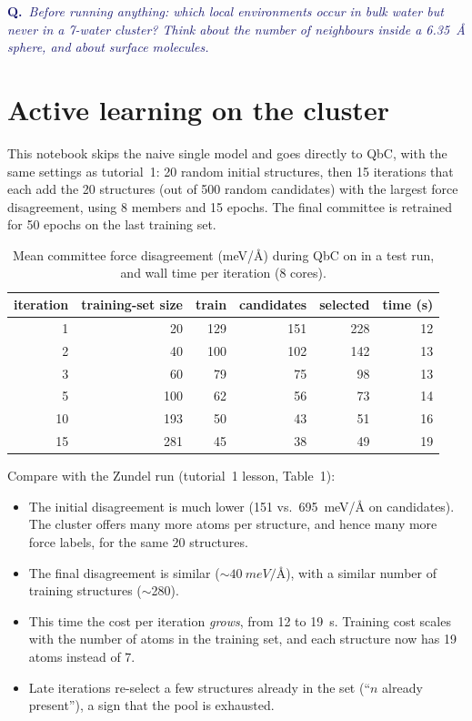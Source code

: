 \documentclass[11pt,a4paper]{article}
\newcommand{\question}[1]{\par\smallskip\noindent\textcolor{MidnightBlue}{\textbf{Q.}~\emph{#1}}\par\smallskip}
\begin{document}
\question{Before running anything: which local environments occur in bulk
water but never in a 7-water cluster? Think about the number of neighbours
inside a \SI{6.35}{\angstrom} sphere, and about surface molecules.}

\section{Active learning on the cluster}

This notebook skips the naive single model and goes directly to QbC, with the
same settings as tutorial~1: 20 random initial structures, then 15 iterations
that each add the 20 structures (out of 500 random candidates) with the largest
force disagreement, using 8 members and 15 epochs. The final committee is
retrained for 50 epochs on the last training set.

\begin{table}[h]
\centering\small
\caption{Mean committee force disagreement (\si{meV/\angstrom}) during QbC on
 in a test run, and wall time per iteration (8 cores).}
\label{tab:qbc}
\begin{tabular}{@{}rrrrrr@{}}
\toprule
iteration & training-set size & train & candidates & selected & time (s)\\
\midrule
1  & 20  & 129 & 151 & 228 & 12\\
2  & 40  & 100 & 102 & 142 & 13\\
3  & 60  &  79 &  75 &  98 & 13\\
5  & 100 &  62 &  56 &  73 & 14\\
10 & 193 &  50 &  43 &  51 & 16\\
15 & 281 &  45 &  38 &  49 & 19\\
\bottomrule
\end{tabular}
\end{table}

Compare with the Zundel run (tutorial~1 lesson, Table~1):
\begin{itemize}[nosep]
  \item The initial disagreement is much lower (151 vs.\ \SI{695}{meV/\angstrom}
        on candidates). The cluster offers many more atoms per structure, and
        hence many more force labels, for the same 20 structures.
  \item The final disagreement is similar ($\sim\SI{40}{meV/\angstrom}$), with a
        similar number of training structures ($\sim$280).
  \item This time the cost per iteration \emph{grows}, from 12 to \SI{19}{s}.
        Training cost scales with the number of atoms in the training set, and
        each structure now has 19 atoms instead of 7.
  \item Late iterations re-select a few structures already in the set
        (``$n$ already present''), a sign that the pool is exhausted.
\end{itemize}
\end{document}
